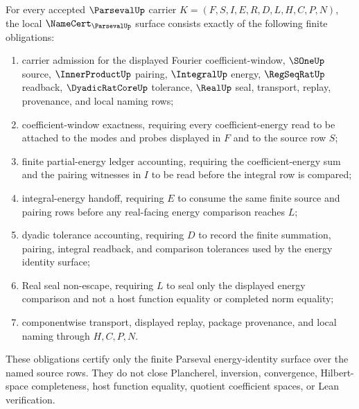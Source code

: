 \begin{theorem}\label{thm:parseval-namecert-obligations}
For every accepted $\ParsevalUp$ carrier $K=(F,S,I,E,R,D,L,H,C,P,N)$, the local $\NameCert_{\ParsevalUp}$ surface consists exactly of the following finite obligations:
\begin{enumerate}
\item carrier admission for the displayed Fourier coefficient-window, $\SOneUp$ source, $\InnerProductUp$ pairing, $\IntegralUp$ energy, $\RegSeqRatUp$ readback, $\DyadicRatCoreUp$ tolerance, $\RealUp$ seal, transport, replay, provenance, and local naming rows;
\item coefficient-window exactness, requiring every coefficient-energy read to be attached to the modes and probes displayed in $F$ and to the source row $S$;
\item finite partial-energy ledger accounting, requiring the coefficient-energy sum and the pairing witnesses in $I$ to be read before the integral row is compared;
\item integral-energy handoff, requiring $E$ to consume the same finite source and pairing rows before any real-facing energy comparison reaches $L$;
\item dyadic tolerance accounting, requiring $D$ to record the finite summation, pairing, integral readback, and comparison tolerances used by the energy identity surface;
\item Real seal non-escape, requiring $L$ to seal only the displayed energy comparison and not a host function equality or completed norm equality;
\item componentwise transport, displayed replay, package provenance, and local naming through $H,C,P,N$.
\end{enumerate}
These obligations certify only the finite Parseval energy-identity surface over the named source rows. They do not close Plancherel, inversion, convergence, Hilbert-space completeness, host function equality, quotient coefficient spaces, or Lean verification.
\end{theorem}
